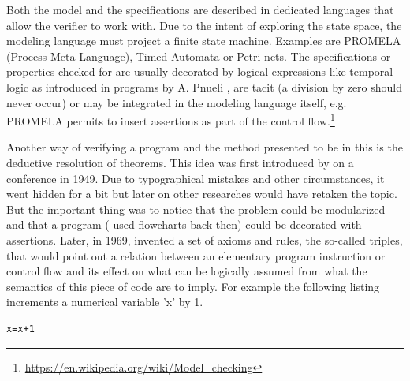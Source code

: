 Both the model and the specifications are described in dedicated languages that allow the verifier to work with. Due to the intent of exploring the state space, the modeling language must project a finite state machine. Examples are PROMELA (Process Meta Language), Timed Automata or Petri nets. The specifications or properties checked for are usually decorated by logical expressions like temporal logic as introduced in programs by A. Pnueli \cite{Pnueli:1977:TLP:1382431.1382534}, are tacit (a division by zero should never occur) or may be integrated in the modeling language itself, e.g. PROMELA permits to insert assertions as part of the control flow.\footnote{\url{https://en.wikipedia.org/wiki/Model_checking}}

%
%

Another way of verifying a program and the method presented to be in this \paper{} is the deductive resolution of theorems. This idea was first introduced by  on a conference in 1949. Due to typographical mistakes and other circumstances, it went hidden for a bit but later on other researches would have retaken the topic. But the important thing was to notice that the problem could be modularized and that a program ( used flowcharts back then) could be decorated with assertions. Later, in 1969,  invented a set of axioms and rules, the so-called  triples, that would point out a relation between an elementary program instruction or control flow and its effect on what can be logically assumed from what the semantics of this piece of code are to imply. For example the following listing increments a numerical variable 'x' by 1.

\begin{center}
	\begin{lstlisting}[caption={First listing}]
		x=x+1
	\end{lstlisting}
\end{center}

